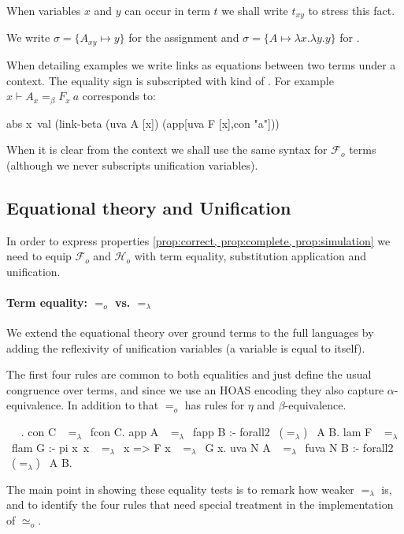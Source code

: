 \documentclass[sigconf,natbib=false,review]{acmart}
\newcommand{\EqualRel}{\ensuremath{=}}
\newcommand{\UnifRel}{\ensuremath{\simeq}}
\newcommand{\Uo}{\ensuremath{\UnifRel_o}\xspace}
\newcommand{\Eo}{\ensuremath{\EqualRel_o}\xspace}
\newcommand{\Ee}{\ensuremath{\EqualRel_\lambda}\xspace}
\newcommand{\Fo}{\ensuremath{\mathcal{F}_{\!o}\xspace}} %
\newcommand{\Ho}{\ensuremath{\mathcal{H}_o}\xspace}
\newcommand{\linkbetaM}[3]{\ensuremath{#1 \vdash #2 =_\beta #3}}
\begin{document}
\noindent
When variables $x$ and $y$ can occur in term $t$ we shall write
$t_{xy}$ to stress this fact. 

We write $\sigma = \{ A_{xy} \mapsto y\}$ for the assignment
 and $\sigma = \{ A \mapsto \lambda x.\lambda y.y\}$
for .

When detailing examples we write links as equations between two
terms under a context.
The equality sign is subscripted with
kind of . For example $\linkbetaM{x}{A_x}{F_x~a}$ corresponds to:
\begin{elpicode}
abs x\ val (link-beta (uva A [x]) (app[uva F [x],con "a"]))
\end{elpicode}

\noindent
When it is clear from the context we shall use the same syntax for \Fo{} terms
(although we never subscripts unification variables).

\subsection{Equational theory and Unification}

In order to express properties \ref{prop:correct, prop:complete, prop:simulation}
we need to equip \Fo{} and \Ho with term equality,
substitution application and unification.

\paragraph{Term equality: \Eo vs. \Ee} We extend the equational theory
over ground terms to the full languages by adding the reflexivity of
unification variables (a variable is equal to itself).

The first four rules are common to both equalities
and just define the usual congruence over terms, and since
we use an HOAS encoding they also capture $\alpha$-equivalence.
In addition to that \Eo has rules for $\eta$ and $\beta$-equivalence.



\begin{elpicode}
  ~ \PYG{n+nf}{(\Ee)} ~.
  con C ~\Ee~fcon C.
  app A ~\Ee~fapp B :- forall2 ~(\Ee)~ A B.
  lam F ~\Ee~flam G :- pi x\ x ~\Ee~x => F x ~\Ee~G x.
  uva N A ~\Ee~fuva N B :- forall2 ~(\Ee)~ A B.
\end{elpicode}

\noindent
The main point in showing these equality tests is to remark how weaker \Ee is,
and to identify the four rules that need special treatment in
the implementation of \Uo.
\end{document}
